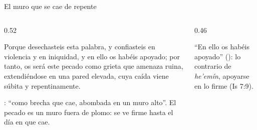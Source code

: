 \begin{frame}{El muro que se cae de repente}
\begin{columns}[c,onlytextwidth]
\begin{column}{0.52\textwidth}
\begin{cita}Porque desechasteis esta palabra, y confiasteis en violencia y en iniquidad, y en ello os habéis apoyado; por tanto, os será este pecado como grieta que amenaza ruina, extendiéndose en una pared elevada, cuya caída viene súbita y repentinamente.\end{cita}
\scriptsize{}: ``como brecha que cae, abombada en un muro alto''. El pecado es un muro fuera de plomo: se ve firme hasta el día en que cae.
\end{column}
\begin{column}{0.46\textwidth}
\centering
{}\par\smallskip
\scriptsize ``En ello os habéis apoyado'' (): lo contrario de \emph{he'emín}, apoyarse en lo firme (Is 7:9).
\end{column}
\end{columns}
\end{frame}

